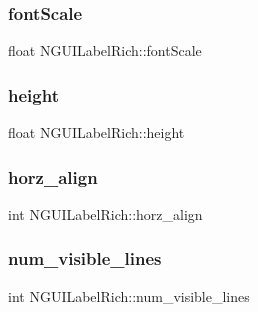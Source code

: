 \hypertarget{class_n_g_u_i_label_rich_a267bfdaf2984db7b564e10c0d4142d66}{}\label{class_n_g_u_i_label_rich_a267bfdaf2984db7b564e10c0d4142d66} 
\subsubsection{\texorpdfstring{font\+Scale}{fontScale}}
{\footnotesize\ttfamily float N\+G\+U\+I\+Label\+Rich\+::font\+Scale}

\hypertarget{class_n_g_u_i_label_rich_a552bdbd8f1e4a2ec4ea3da0ce06d7690}{}\label{class_n_g_u_i_label_rich_a552bdbd8f1e4a2ec4ea3da0ce06d7690} 
\subsubsection{\texorpdfstring{height}{height}}
{\footnotesize\ttfamily float N\+G\+U\+I\+Label\+Rich\+::height}

\hypertarget{class_n_g_u_i_label_rich_a40c0e2d2c19d3a747dd726f0842a524c}{}\label{class_n_g_u_i_label_rich_a40c0e2d2c19d3a747dd726f0842a524c} 
\subsubsection{\texorpdfstring{horz\+\_\+align}{horz\_align}}
{\footnotesize\ttfamily int N\+G\+U\+I\+Label\+Rich\+::horz\+\_\+align}

\hypertarget{class_n_g_u_i_label_rich_a313eec0b812c665083e41fb813b80275}{}\label{class_n_g_u_i_label_rich_a313eec0b812c665083e41fb813b80275} 
\subsubsection{\texorpdfstring{num\+\_\+visible\+\_\+lines}{num\_visible\_lines}}
{\footnotesize\ttfamily int N\+G\+U\+I\+Label\+Rich\+::num\+\_\+visible\+\_\+lines}

